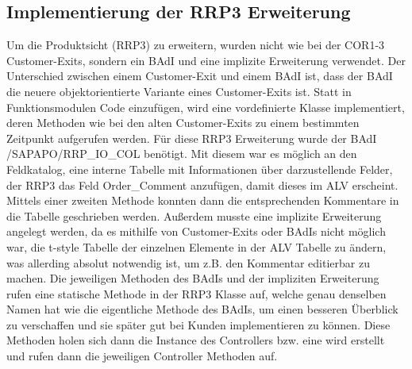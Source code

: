 \subsection{Implementierung der RRP3 Erweiterung}
\label{sec:Implementierung der RRP3 Erweiterung}   
Um die Produktsicht (RRP3) zu erweitern, wurden nicht wie bei der COR1-3 Customer-Exits, sondern ein \ac{BAdI} und eine implizite Erweiterung verwendet. Der Unterschied zwischen einem Customer-Exit und einem \ac{BAdI} ist, dass der \ac{BAdI} die neuere objektorientierte Variante eines Customer-Exits ist. Statt in Funktionsmodulen Code einzufügen, wird eine vordefinierte Klasse implementiert, deren Methoden wie bei den alten Customer-Exits zu einem bestimmten Zeitpunkt aufgerufen werden. Für diese RRP3 Erweiterung wurde der \ac{BAdI} /SAPAPO/RRP\_IO\_COL benötigt. Mit diesem war es möglich an den Feldkatalog, eine interne Tabelle mit Informationen über darzustellende Felder, der RRP3 das Feld Order\_Comment anzufügen, damit dieses im \ac{ALV} erscheint. Mittels einer zweiten Methode konnten dann die entsprechenden Kommentare in die Tabelle geschrieben werden. Außerdem musste eine implizite Erweiterung angelegt werden, da es mithilfe von Customer-Exits oder \ac{BAdI}s nicht möglich war, die t-style Tabelle der einzelnen Elemente in der \ac{ALV} Tabelle zu ändern, was allerding absolut notwendig ist, um z.B. den Kommentar editierbar zu machen. Die jeweiligen Methoden des \ac{BAdI}s und der impliziten Erweiterung rufen eine statische Methode in der RRP3 Klasse auf, welche genau denselben Namen hat wie die eigentliche Methode des \ac{BAdI}s, um einen besseren Überblick zu verschaffen und sie später gut bei Kunden implementieren zu können. Diese Methoden holen sich dann die Instance des Controllers bzw. eine wird erstellt und rufen dann die jeweiligen Controller Methoden auf.

